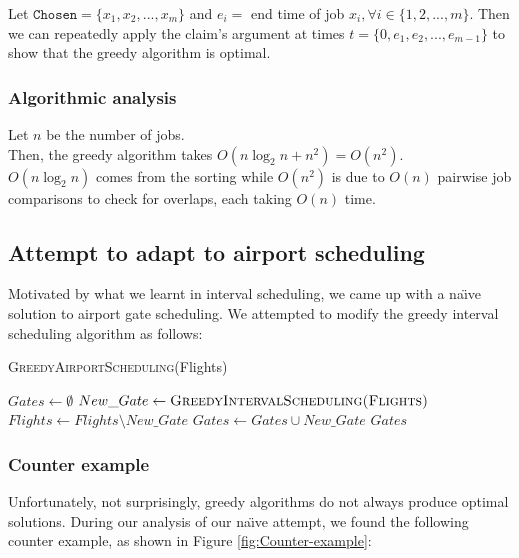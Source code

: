 \documentclass[12pt, a4paper]{report}
\begin{document}
Let $\texttt{Chosen} = \{x_1, x_2, ..., x_m\}$ and $e_i = $ end time of job $x_i, \forall i \in \{1, 2, ..., m\}$. Then we can repeatedly apply the claim's argument at times $t = \{0, e_1, e_2, ... , e_{m-1}\}$ to show that the greedy algorithm is optimal.

\subsubsection{Algorithmic analysis}
Let $n$ be the number of jobs.\\
Then, the greedy algorithm takes $O(n \log_2 n + n^2) = O(n^2)$.\\
$O(n \log_2 n)$ comes from the sorting while $O(n^2)$ is due to $O(n)$ pairwise job comparisons to check for overlaps, each taking $O(n)$ time.

\subsection{Attempt to adapt to airport scheduling}
Motivated by what we learnt in interval scheduling, we came up with a na\"{\i}ve solution to airport gate scheduling. We attempted to modify the greedy interval scheduling algorithm as follows:

\begin{algorithm}[h!]
\begin{algorithmic}[1]
\caption{\textsc{GreedyAirportScheduling}(Flights)}
\label{alg:Greedy Airport Scheduling}
\STATE $Gates \leftarrow \emptyset$
	\STATE $New\_Gate \leftarrow \textsc{GreedyIntervalScheduling(Flights)}$
	\STATE $Flights \leftarrow Flights \setminus New\_Gate$
	\STATE $Gates \leftarrow Gates \cup New\_Gate$
\ENDWHILE
\RETURN $Gates$
\end{algorithmic}
\end{algorithm}

\newpage
\subsubsection{Counter example}
Unfortunately, not surprisingly, greedy algorithms do not always produce optimal solutions. During our analysis of our na\"{\i}ve attempt, we found the following counter example, as shown in Figure \ref{fig:Counter-example}:
\end{document}
